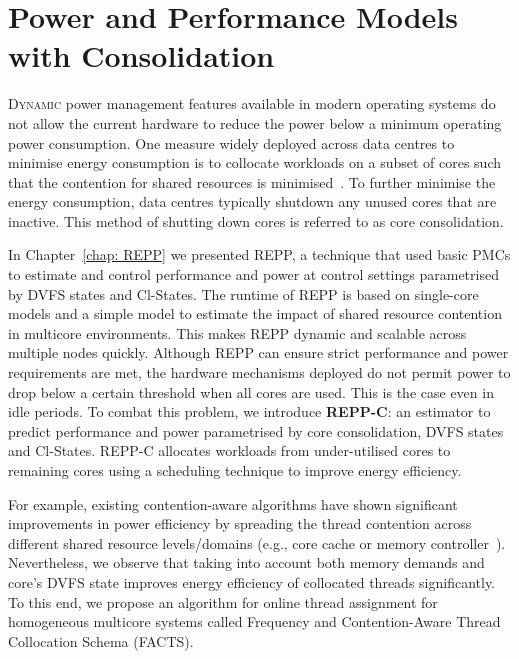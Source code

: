 \chapter{Power and Performance Models with Consolidation}
\label{section: REPP-C} 


 \lettrine{D}{ynamic} power management features available in modern operating
systems do not allow the current hardware to reduce the power below a minimum operating
power consumption. One measure widely deployed across data centres to minimise energy
consumption is to collocate workloads on a subset of cores such that the contention for
shared resources is minimised~\citep{Blagodurov:2010:CSM:1880018.1880019,
Mars2013Whare-map, Zhuravlev:2012:SST:2379776.2379780, Mars:2011:BIU:2155620.2155650,
Yang2013Bubble-flux, Cochran:2011:PCA:2155620.2155641, Olsen:2006:PEP:1137248.1137532,
Singh:2009:RTP:1577129.1577137, Gandhi:2010:OAE:1869138.1869264}. To further minimise the
energy consumption, data centres typically shutdown any unused cores that are inactive.
This method of shutting down cores is referred to as core consolidation.

 In Chapter~\ref{chap: REPP} we presented REPP, a technique that used basic
PMCs to estimate and control performance and power at control settings parametrised by
DVFS states and Cl-States.  The runtime of REPP is based on single-core models and a
simple model to estimate the impact of shared resource contention in multicore
environments. This makes REPP dynamic and scalable across multiple nodes quickly.
Although REPP can ensure strict performance and power requirements are met, the hardware
mechanisms deployed do not permit power to drop below a certain threshold when all cores
are used. This is the case even in idle periods. To combat this problem, we introduce
\textbf{REPP-C}: an estimator to predict performance and power parametrised by core
consolidation, DVFS states and Cl-States. REPP-C allocates workloads from under-utilised
cores to remaining cores using a scheduling technique to improve energy efficiency.  

For example, existing contention-aware algorithms have shown significant improvements in
power efficiency by  spreading the thread contention across different shared resource
levels/domains (e.g., core cache or memory
controller~\citep{Zhuravlev:2012:SST:2379776.2379780}).  Nevertheless, we observe that
taking into account both memory demands and core's DVFS state improves energy efficiency
of collocated threads significantly. To this end, we propose an algorithm for online
thread assignment for homogeneous multicore systems called Frequency and Contention-Aware
Thread Collocation Schema (FACTS).  

